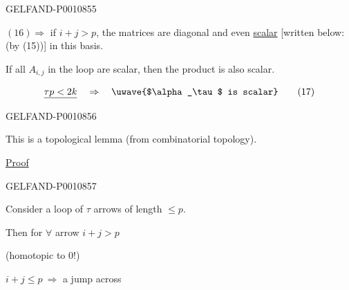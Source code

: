 \begin{GelfandAdjacentEvidence}{GELFAND-P001085}{5}


$(16)\Rightarrow$ if $i+j>p$, the matrices are diagonal and even \uline{scalar}
[written below: (by (15))] in this basis.

If all $A_{i,j}$ in the loop are scalar, then the product is also scalar.

\begin{equation*}
\underline{\tau p<2k}\quad\Rightarrow\quad
\text{\uwave{$\alpha_\tau$ is scalar}}
\tag{17}
\end{equation*}
\end{GelfandAdjacentEvidence}
\begin{GelfandAdjacentEvidence}{GELFAND-P001085}{6}


This is a topological lemma (from combinatorial topology).

\uline{Proof}

\end{GelfandAdjacentEvidence}
\begin{GelfandAdjacentEvidence}{GELFAND-P001085}{7}


Consider a loop of $\tau$ arrows of length $\le p$.

Then for $\forall$ arrow $i+j>p$

(homotopic to $0$!)

$i+j\le p\ \Rightarrow$ a jump across
\end{GelfandAdjacentEvidence}
